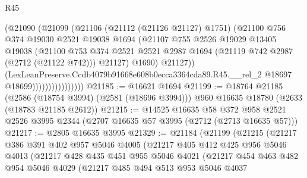 \begin{lexlean}{R45}
\begin{coremodule}
                              (@21090
                                (@21099
                                  (@21106
                                    (@21112 (@21126 @21127) @1751)
                                    (@21100
                                      @756
                                      @374
                                      @19030
                                      @2521
                                      @19038
                                      @1694
                                      (@21107
                                        @755
                                        @2526
                                        @19029
                                        @13405
                                        @19038
                                        (@21100
                                          @753
                                          @374
                                          @2521
                                          @2521
                                          @2987
                                          @1694
                                          (@21119 @742 @2987 (@2712 (@21122 @742)))
                                          @21127)
                                        @1690)
                                      @21127))
                                  (LexLeanPreserve.Ccdb4079b91668e608b0ecca3364cda89.R45.__rel_2
                                    @18697
                                    @18699))))))))))))))))
@21185 := @16621 @1694
@21199 := @18764
    @21185
    (@2586 (@18754 @3994) (@2581 (@18696 @3994)))
    @960
    @16635
    @18780
    (@2633 (@18783 @21185 @2612))
@21215 := @14525
    @16635
    @58
    @372
    @958
    @2521
    @2526
    @3995
    @2344
    (@2707 @16635 @57 @3995 (@2712 (@2713 @16635 @57)))
@21217 := @2805 @16635 @3995
@21329 := @21184
    (@21199
      (@21215
        (@21217
          @386
          @391
          @402
          @957
          @5046
          @4005
          (@21217
            @405
            @412
            @425
            @956
            @5046
            @4013
            (@21217
              @428
              @435
              @451
              @955
              @5046
              @4021
              (@21217
                @454
                @463
                @482
                @954
                @5046
                @4029
                (@21217
                  @485
                  @494
                  @513
                  @953
                  @5046
                  @4037

\end{coremodule}
\end{lexlean}
